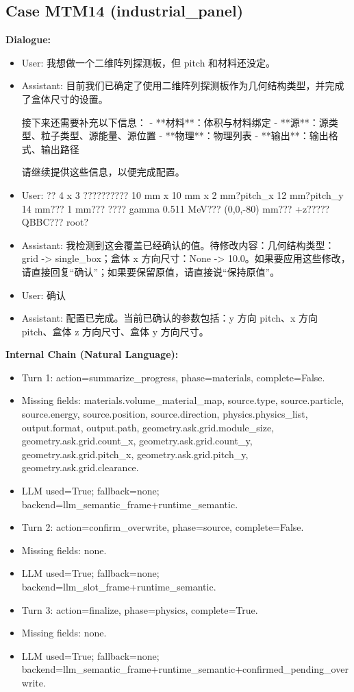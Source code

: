 \documentclass[11pt]{ctexart}
\begin{document}
\subsection{Case MTM14 (industrial\_panel)}
\textbf{Dialogue:}
\begin{itemize}
\item User: 我想做一个二维阵列探测板，但 pitch 和材料还没定。
\item Assistant: 目前我们已确定了使用二维阵列探测板作为几何结构类型，并完成了盒体尺寸的设置。

接下来还需要补充以下信息：
- **材料**：体积与材料绑定
- **源**：源类型、粒子类型、源能量、源位置
- **物理**：物理列表
- **输出**：输出格式、输出路径

请继续提供这些信息，以便完成配置。
\item User: ?? 4 x 3 ?????????? 10 mm x 10 mm x 2 mm?pitch\_x 12 mm?pitch\_y 14 mm??? 1 mm??? ???? gamma 0.511 MeV??? (0,0,-80) mm??? +z????? QBBC??? root?
\item Assistant: 我检测到这会覆盖已经确认的值。待修改内容：几何结构类型：grid -> single\_box；盒体 x 方向尺寸：None -> 10.0。如果要应用这些修改，请直接回复“确认”；如果要保留原值，请直接说“保持原值”。
\item User: 确认
\item Assistant: 配置已完成。当前已确认的参数包括：y 方向 pitch、x 方向 pitch、盒体 z 方向尺寸、盒体 y 方向尺寸。
\end{itemize}
\textbf{Internal Chain (Natural Language):}
\begin{itemize}
\item Turn 1: action=summarize\_progress, phase=materials, complete=False.
\item Missing fields: materials.volume\_material\_map, source.type, source.particle, source.energy, source.position, source.direction, physics.physics\_list, output.format, output.path, geometry.ask.grid.module\_size, geometry.ask.grid.count\_x, geometry.ask.grid.count\_y, geometry.ask.grid.pitch\_x, geometry.ask.grid.pitch\_y, geometry.ask.grid.clearance.
\item LLM used=True; fallback=none; backend=llm\_semantic\_frame+runtime\_semantic.
\item Turn 2: action=confirm\_overwrite, phase=source, complete=False.
\item Missing fields: none.
\item LLM used=True; fallback=none; backend=llm\_slot\_frame+runtime\_semantic.
\item Turn 3: action=finalize, phase=physics, complete=True.
\item Missing fields: none.
\item LLM used=True; fallback=none; backend=llm\_semantic\_frame+runtime\_semantic+confirmed\_pending\_overwrite.
\end{itemize}
\end{document}
